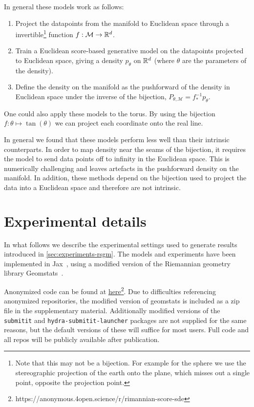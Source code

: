 In general these models work as follows: \begin{enumerate} \item Project the datapoints from the manifold to Euclidean space through a invertible\footnote{Note that this may not be a bijection.
		      For example for the sphere we use the stereographic projection of the earth onto the plane, which misses out a single point, opposite the projection point.
	      } function $f: \mathcal{M} \to \mathbb{R}^d$.
	\item Train a Euclidean score-based generative model on the datapoints projected to Euclidean space, giving a density $p_{\theta}$ on $\mathbb{R}^d$ (where $\theta$ are the parameters of the density).
	\item Define the density on the manifold as the pushforward of the density in Euclidean space under the inverse of the bijection, $P_{\theta, \mathcal{M}} = f^{-1}_* p_{\theta}$.
\end{enumerate}

One could also apply these models to the torus.
By using the bijection $f: \theta \mapsto \tan(\theta)$ we can project each coordinate onto the real line.

In general we found that these models perform less well than their intrinsic counterparts.
In order to map density near the seams of the bijection, it requires the model to send data points off to infinity in the Euclidean space.
This is numerically challenging and leaves artefacts in the pushforward density on the manifold.
In addition, these methods depend on the bijection used to project the data into a Euclidean space and therefore are not intrinsic.

\section{Experimental details}
\label{sec:exp_detail}

In what follows we describe the experimental settings used to generate results introduced in \cref{sec:experiments-rsgm}.
The models and experiments have been implemented in Jax~\parencite{jax2018github}, using a modified version of the Riemannian geometry library Geomstats~\parencite{geomstats2020}.

Anonymized code can be found at \href{https://anonymous.4open.science/r/rimannian-score-sde}{here}\footnote{https://anonymous.4open.science/r/rimannian-score-sde}.
Due to difficulties referencing anonymized repositories, the modified version of geomstats is included as a zip file in the supplementary material.
Additionally modified versions of the \verb'submitit' and \verb'hydra-submitit-launcher' packages are not supplied for the same reasons, but the default versions of these will suffice for most users.
Full code and all repos will be publicly available after publication.

